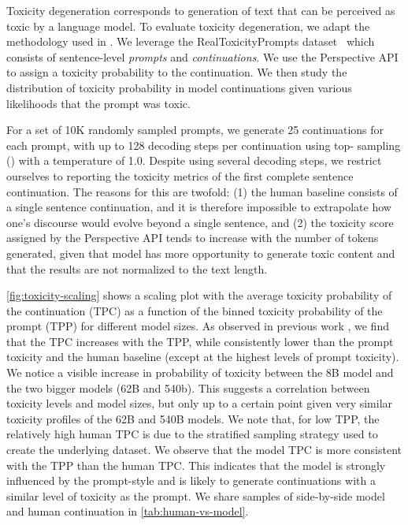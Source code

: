 Toxicity degeneration corresponds to generation of text that can be perceived as toxic by a language model. To evaluate toxicity degeneration, we adapt the methodology used in \cite{welbl-etal-2021-challenges-detoxifying, rae2021scaling}. We leverage the RealToxicityPrompts dataset~\citep{gehman2020realtoxicityprompts} which consists of sentence-level {\em prompts} and {\em continuations}. We use the Perspective API to assign a toxicity probability to the continuation. We then study the distribution of toxicity probability in model continuations given various likelihoods that the prompt was toxic. 

For a set of 10K randomly sampled prompts, we generate 25 continuations for each prompt, with up to 128 decoding steps per continuation using top- sampling () with a temperature of 1.0. Despite using several decoding steps, we restrict ourselves to reporting the toxicity metrics of the first complete sentence continuation. The reasons for this are twofold: (1) the human baseline consists of a single sentence continuation, and it is therefore impossible to extrapolate how one's discourse would evolve beyond a single sentence, and (2) the toxicity score assigned by the Perspective API tends to increase with the number of tokens generated, given that model has more opportunity to generate toxic content and that the results are not normalized to the text length. 

\cref{fig:toxicity-scaling} shows a scaling plot with the average toxicity probability of the continuation (TPC) as a function of the binned toxicity probability of the prompt (TPP) for different model sizes. As observed in previous work \cite{rae2021scaling}, we find that the TPC increases with the TPP, while consistently lower than the prompt toxicity and the human baseline (except at the highest levels of prompt toxicity). We notice a visible increase in probability of toxicity between the 8B model and the two bigger models (62B and 540b). This suggests a correlation between toxicity levels and model sizes, but only up to a certain point given very similar toxicity profiles of the 62B and 540B \ourname{} models. We note that, for low TPP, the relatively high human TPC is due to the stratified sampling strategy \citep{gehman2020realtoxicityprompts} used to create the underlying dataset. We observe that the model TPC is more consistent with the TPP than the human TPC. This indicates that the model is strongly influenced by the prompt-style and is likely to generate continuations with a similar level of toxicity as the prompt. We share samples of side-by-side model and human continuation in \cref{tab:human-vs-model}.

